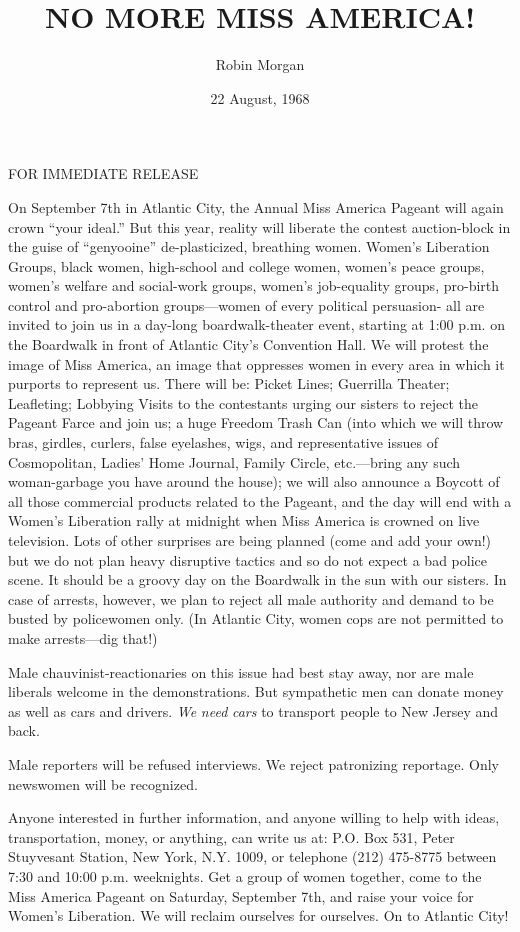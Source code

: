 \documentclass{article}
\title{NO MORE MISS AMERICA!}
\author{Robin Morgan}
\date{22 August, 1968}
\begin{document}
\maketitle

FOR IMMEDIATE RELEASE

On September 7th in Atlantic City, the Annual Miss America Pageant will again
crown ``your ideal.'' But this year, reality will liberate the contest
auction-block in the guise of ``genyooine'' de-plasticized, breathing women.
Women's Liberation Groups, black women, high-school and college women, women’s
peace groups, women's welfare and social-work groups, women's job-equality
groups, pro-birth control and pro-abortion groups---women of every political
persuasion- all are invited to join us in a day-long boardwalk-theater event,
starting at 1:00 p.m. on the Boardwalk in front of Atlantic City's Convention
Hall. We will protest the image of Miss America, an image that oppresses women
in every area in which it purports to represent us. There will be: Picket
Lines; Guerrilla Theater; Leafleting; Lobbying Visits to the contestants urging
our sisters to reject the Pageant Farce and join us; a huge Freedom Trash Can
(into which we will throw bras, girdles, curlers, false eyelashes, wigs, and
representative issues of Cosmopolitan, Ladies' Home Journal, Family Circle,
etc.---bring any such woman-garbage you have around the house); we will also
announce a Boycott of all those commercial products related to the Pageant, and
the day will end with a Women's Liberation rally at midnight when Miss America
is crowned on live television. Lots of other surprises are being planned (come
and add your own!) but we do not plan heavy disruptive tactics and so do not
expect a bad police scene. It should be a groovy day on the Boardwalk in the
sun with our sisters. In case of arrests, however, we plan to reject all male
authority and demand to be busted by policewomen only. (In Atlantic City, women
cops are not permitted to make arrests---dig that!)


Male chauvinist-reactionaries on this issue had best stay away, nor are male
liberals welcome in the demonstrations. But sympathetic men can donate money as
well as cars and drivers. \emph{We} \emph{need} \emph{cars} to transport people
to New Jersey and back.

Male reporters will be refused interviews. We reject patronizing reportage.
Only newswomen will be recognized. 

Anyone interested in further information, and anyone willing to help with
ideas, transportation, money, or anything, can write us at: P.O. Box 531, Peter
Stuyvesant Station, New York, N.Y. 1009, or telephone (212) 475-8775 between
7:30 and 10:00 p.m. weeknights.  Get a group of women together, come to the
Miss America Pageant on Saturday, September 7th, and raise your voice for
Women's Liberation.  We will reclaim ourselves for ourselves. On to Atlantic
City!
\end{document}
